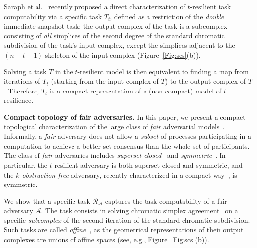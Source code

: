 \documentclass[a4paper]{article}
\newcommand{\myparagraph}[1]{\vspace{6pt}\noindent \textbf{#1}}
\def\A{\ensuremath{\mathcal{A}}}
\def\R{\ensuremath{\mathcal{R}}}
\def\fair{\textit{fair}}
\begin{document}

Saraph et al.~\cite{SHG16} recently proposed a direct characterization
of $t$-resilient %
task computability via a specific task $T_t$, defined 
as a restriction of the \emph{double} immediate snapshot
task: the output complex of the task is a subcomplex consisting of
\emph{all} simplices of the second degree of the standard chromatic
subdivision of the task's input complex, except the simplices 
adjacent to the $(n-t-1)$-skeleton of the input
complex (Figure~\ref{Fig:scs}(b)).

Solving a %
task $T$ in the  $t$-resilient model is then equivalent to finding a map from
iterations of $T_t$ (starting from the input complex of $T$) to the output complex of $T$.   
Therefore, $T_t$ is a compact representation of a (non-compact) model
of  $t$-resilience. 


\myparagraph{Compact topology of fair adversaries.}
In this paper, we present a compact topological characterization
of the large class of \emph{\fair} adversarial models~\cite{KR17}.
Informally, a {\fair} adversary does not allow a \emph{subset} of
processes participating in a computation to achieve a better 
set consensus than the whole set of participants.
%
%
The class of {\fair} adversaries includes \emph{superset-closed}~\cite{Kuz12}
and \emph{symmetric}~\cite{Tau10}.
%
In particular, the $t$-resilient adversary is both superset-closed and
symmetric, and the \emph{$k$-obstruction free} adversary, recently
characterized in a compact way~\cite{GHKR16}, is symmetric.  



%
We show that a specific task
$\R_{\A}$ captures the task computability of a fair adversary $\A$.  
The task consists in solving chromatic simplex
agreement~\cite{BG97,HS99} on a specific \emph{subcomplex} of the second
iteration of the standard chromatic  subdivision.
Such tasks are called \emph{affine}~\cite{GKM14-podc,GHKR16}, as
the geometrical representations of their output complexes are
unions of affine spaces (see, e.g., Figure~\ref{Fig:scs}(b)).  
\end{document}
